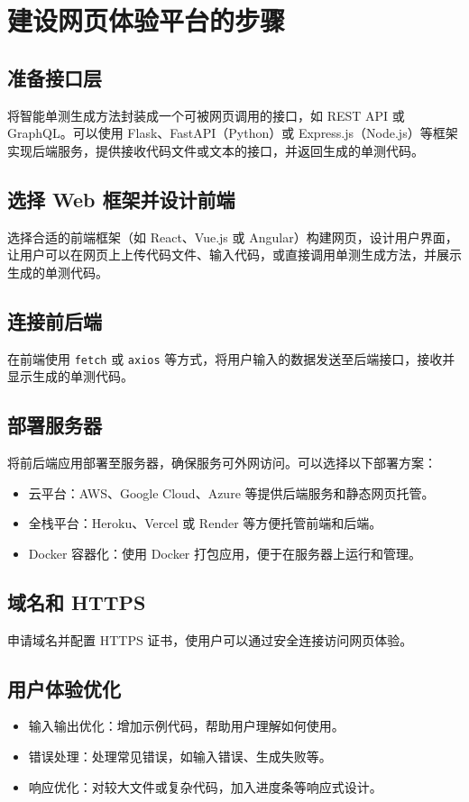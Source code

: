 \chapter{建设网页体验平台的步骤}

\section{准备接口层}
将智能单测生成方法封装成一个可被网页调用的接口，如 REST API 或 GraphQL。可以使用 Flask、FastAPI（Python）或 Express.js（Node.js）等框架实现后端服务，提供接收代码文件或文本的接口，并返回生成的单测代码。

\section{选择 Web 框架并设计前端}
选择合适的前端框架（如 React、Vue.js 或 Angular）构建网页，设计用户界面，让用户可以在网页上上传代码文件、输入代码，或直接调用单测生成方法，并展示生成的单测代码。

\section{连接前后端}
在前端使用 \texttt{fetch} 或 \texttt{axios} 等方式，将用户输入的数据发送至后端接口，接收并显示生成的单测代码。

\section{部署服务器}
将前后端应用部署至服务器，确保服务可外网访问。可以选择以下部署方案：
\begin{itemize}
    \item 云平台：AWS、Google Cloud、Azure 等提供后端服务和静态网页托管。
    \item 全栈平台：Heroku、Vercel 或 Render 等方便托管前端和后端。
    \item Docker 容器化：使用 Docker 打包应用，便于在服务器上运行和管理。
\end{itemize}

\section{域名和 HTTPS}
申请域名并配置 HTTPS 证书，使用户可以通过安全连接访问网页体验。

\section{用户体验优化}
\begin{itemize}
    \item 输入输出优化：增加示例代码，帮助用户理解如何使用。
    \item 错误处理：处理常见错误，如输入错误、生成失败等。
    \item 响应优化：对较大文件或复杂代码，加入进度条等响应式设计。
\end{itemize}


